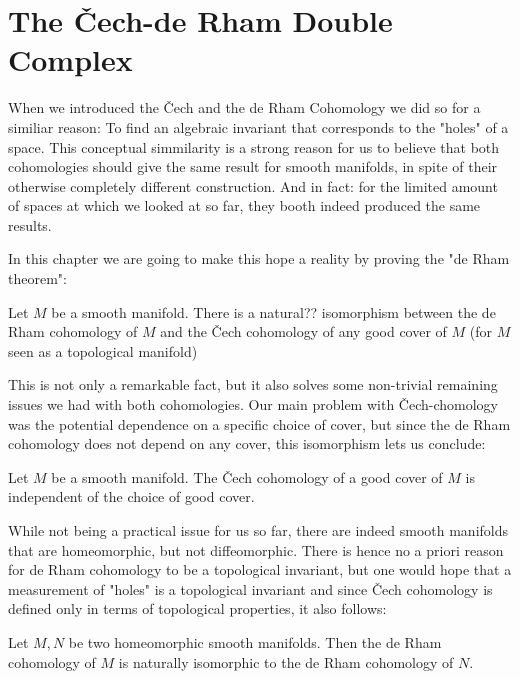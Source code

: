 \chapter{The Čech-de Rham Double Complex}
When we introduced the Čech and the de Rham Cohomology we did so for a similiar
reason: To find an algebraic invariant that corresponds to the "holes" of a space.
This conceptual simmilarity is a strong reason for us to believe that both cohomologies
should give the same result for smooth manifolds, in spite of their otherwise completely
different construction. And in fact: for the limited amount of spaces at which we looked
at so far, they booth indeed produced the same results.

In this chapter we are going to make this hope a reality by proving the "de Rham theorem":
\begin{theorem}
Let $M$ be a smooth manifold. There is a natural?? isomorphism between the de Rham cohomology of $M$
and the Čech cohomology of any good cover of $M$ (for $M$ seen as a topological manifold)
\end{theorem}

This is not only a remarkable fact, but it also solves some non-trivial remaining issues
we had with both cohomologies. Our main problem with Čech-chomology was the potential dependence
on a specific choice of cover, but since the de Rham cohomology does not depend on any cover,
this isomorphism lets us conclude:
\begin{corolarry}
Let $M$ be a smooth manifold. The Čech cohomology of a good cover of $M$ is independent
of the choice of good cover.
\end{corolarry}
While not being a practical issue for us so far, there are indeed smooth manifolds that
are homeomorphic, but not diffeomorphic. There is hence no a priori reason for de Rham
cohomology to be a topological invariant, but one would hope that a measurement of "holes"
is a topological invariant and since Čech cohomology is defined only in terms of topological
properties, it also follows:
\begin{corolarry}
Let $M, N$ be two homeomorphic smooth manifolds. Then the de Rham cohomology of $M$ is naturally
isomorphic to the de Rham cohomology of $N$.
\end{corolarry}


